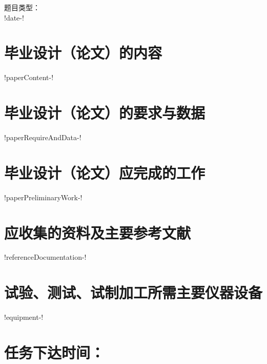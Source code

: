 \documentclass{template}
\begin{document}


\vfill

\begin{quote}
\centering
    \subject{!subjectName-!}
\end{quote}

\vfill

\begin{center}
题目类型：\\[2em]
\large{!date-!}
\end{center}

\newpage

\section{毕业设计（论文）的内容}
!paperContent-!

\section{毕业设计（论文）的要求与数据}
!paperRequireAndData-!

\section{毕业设计（论文）应完成的工作}
!paperPreliminaryWork-!

\section{应收集的资料及主要参考文献}
!referenceDocumentation-!

\section{试验、测试、试制加工所需主要仪器设备}
!equipment-!

\newpage

\section*{任务下达时间：}
\end{document}
